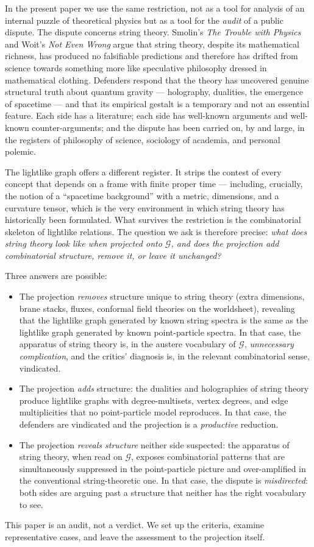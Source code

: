\documentclass[11pt]{article}
\begin{document}
In the present paper we use the same restriction, not as a tool for analysis of an internal puzzle of theoretical physics but as a tool for the \emph{audit} of a public dispute. The dispute concerns string theory. Smolin's \emph{The Trouble with Physics} and Woit's \emph{Not Even Wrong} argue that string theory, despite its mathematical richness, has produced no falsifiable predictions and therefore has drifted from science towards something more like speculative philosophy dressed in mathematical clothing. Defenders respond that the theory has uncovered genuine structural truth about quantum gravity --- holography, dualities, the emergence of spacetime --- and that its empirical gestalt is a temporary and not an essential feature. Each side has a literature; each side has well-known arguments and well-known counter-arguments; and the dispute has been carried on, by and large, in the registers of philosophy of science, sociology of academia, and personal polemic.

The lightlike graph offers a different register. It strips the contest of every concept that depends on a frame with finite proper time --- including, crucially, the notion of a ``spacetime background'' with a metric, dimensions, and a curvature tensor, which is the very environment in which string theory has historically been formulated. What survives the restriction is the combinatorial skeleton of lightlike relations. The question we ask is therefore precise: \emph{what does string theory look like when projected onto $\mathcal{G}$, and does the projection add combinatorial structure, remove it, or leave it unchanged?}

Three answers are possible:
\begin{itemize}
    \item The projection \emph{removes} structure unique to string theory (extra dimensions, brane stacks, fluxes, conformal field theories on the worldsheet), revealing that the lightlike graph generated by known string spectra is the same as the lightlike graph generated by known point-particle spectra. In that case, the apparatus of string theory is, in the austere vocabulary of $\mathcal{G}$, \emph{unnecessary complication}, and the critics' diagnosis is, in the relevant combinatorial sense, vindicated.
    \item The projection \emph{adds} structure: the dualities and holographies of string theory produce lightlike graphs with degree-multisets, vertex degrees, and edge multiplicities that no point-particle model reproduces. In that case, the defenders are vindicated and the projection is a \emph{productive} reduction.
    \item The projection \emph{reveals structure} neither side suspected: the apparatus of string theory, when read on $\mathcal{G}$, exposes combinatorial patterns that are simultaneously suppressed in the point-particle picture and over-amplified in the conventional string-theoretic one. In that case, the dispute is \emph{misdirected}: both sides are arguing past a structure that neither has the right vocabulary to see.
\end{itemize}
This paper is an audit, not a verdict. We set up the criteria, examine representative cases, and leave the assessment to the projection itself.
\end{document}
